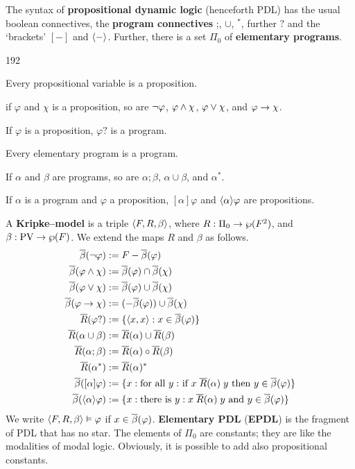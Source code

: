 The syntax of \textbf{propositional dynamic logic} (henceforth PDL) 
has the usual boolean connectives, the \textbf{program connectives} 
;, $\cup$, $^{\ast}$, further $?$ and the `brackets' $[-]$ and 
$\langle -\rangle$. Further, there is a set $\Pi_0$ of \textbf{elementary 
programs}. 
\begin{dingautolist}{192}
\item Every propositional variable is a proposition. 
\item if $\varphi$ and $\chi$ is a proposition, so are 
	$\neg\varphi$, $\varphi\wedge\chi$, $\varphi\vee \chi$, 
	and $\varphi\rightarrow\chi$.
\item If $\varphi$ is a proposition, $\varphi?$ is a program. 
\item Every elementary program is a program.
\item If $\alpha$ and $\beta$ are programs, so are 
	$\alpha;\beta$, $\alpha\cup\beta$, and $\alpha^{\ast}$.
\item If $\alpha$ is a program and $\varphi$ a proposition, 
	$[\alpha]\varphi$ and $\langle\alpha\rangle\varphi$ 
	are propositions.
\end{dingautolist}
A \textbf{Kripke--model} is a triple $\langle F, R, \beta\rangle$, where 
$R : \Pi_0 \rightarrow \wp(F^2)$, and $\beta : \mbox{\rm PV} \rightarrow \wp(F)$. 
We extend the maps $R$ and $\beta$ as follows. 
\begin{equation}
\begin{split}
\overline{\beta}(\neg\varphi) & := F - \overline{\beta}(\varphi) \\
\overline{\beta}(\varphi\wedge\chi) & := \overline{\beta}(\varphi) 
	\cap \overline{\beta}(\chi) \\
\overline{\beta}(\varphi\vee\chi) & := \overline{\beta}(\varphi) 
	\cup \overline{\beta}(\chi) \\
\overline{\beta}(\varphi\rightarrow\chi) & := (- \overline{\beta}(\varphi)) 
	\cup \overline{\beta}(\chi) \\
\overline{R}(\varphi?) & := \{\langle x,x\rangle : x \in \overline{\beta}(\varphi)\} \\
\overline{R}(\alpha\cup\beta) & := \overline{R}(\alpha) \cup \overline{R}(\beta) \\
\overline{R}(\alpha;\beta) & := \overline{R}(\alpha) \circ \overline{R}(\beta) \\
\overline{R}(\alpha^{\ast}) & := \overline{R}(\alpha)^{\ast} \\
\overline{\beta}([\alpha]\varphi) & := 
	\{x : \text{for all $y:$ if } x\; \overline{R}(\alpha)\; y 
	\text{ then } y \in \overline{\beta}(\varphi)\} \\
\overline{\beta}(\langle\alpha\rangle\varphi) & := 
	\{x : \text{there is }y: x\; \overline{R}(\alpha)\; y 
	\text{ and } y \in \overline{\beta}(\varphi)\} 
\end{split}
\end{equation}
We write $\langle F, R, \beta\rangle \vDash \varphi$ if $x \in 
\overline{\beta}(\varphi)$. \textbf{Elementary PDL} (\textbf{EPDL}) 
is the fragment 
of PDL that has no star. The elements of $\Pi_0$ are constants; 
they are like the modalities of modal logic. Obviously, it is 
possible to add also propositional constants.

